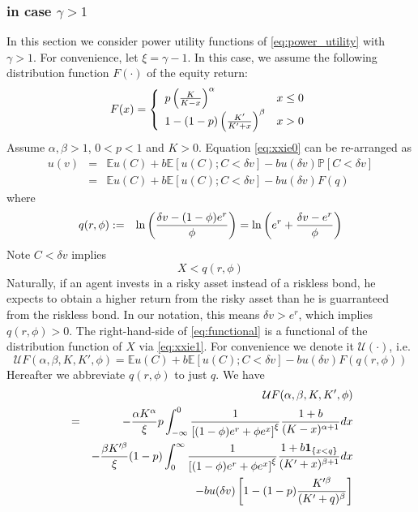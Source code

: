 \documentclass{article}
\newcommand{\E}{
  \mathbb{E}
}
\renewcommand{\P}{
  \mathbb{P}
}
\newcommand{\1}[1]{
  \mathbf{1}_{\{#1\}}
}
\begin{document}

\subsubsection[in case gamma > 1]{in case $\gamma > 1$}
In this section we consider power utility functions of
\eqref{eq:power_utility} with $\gamma > 1$. For convenience,
let $\xi = \gamma - 1$. In this case, we assume the following
distribution function $F(\cdot)$ of the equity return:
\begin{equation}
  \label{eq:X_distr}
  F(x) = \left\{
  \begin{array}{ll}
    p \left(
    {K \over K - x}
    \right)^\alpha & x \leq 0 \\
    1 - (1 - p) \left(
    {K' \over K' + x}
    \right)^\beta & x > 0
  \end{array}
  \right.
\end{equation}
Assume $\alpha, \beta > 1$, $0 < p < 1$ and $K > 0$.
Equation
\eqref{eq:xxie0} can be re-arranged as
\begin{eqnarray}
u(v) &=& \E u(C) + b \E [u(C); C < \delta v] - b u(\delta v) \P[C < \delta v] \nonumber \\
&=& \E u(C) + b \E [u(C); C < \delta v] - b u(\delta v) F(q) \label{eq:functional}
\end{eqnarray}
where
\begin{eqnarray*}
  q(r, \phi) &:=& \ln \left( {
    \delta v - (1 - \phi) e^r
    \over
    \phi
} \right) = \ln\left(
e^r + {\delta v - e^r \over \phi}
\right)
\end{eqnarray*}
Note $C < \delta v$ implies
\[
X < q(r, \phi)
\]
Naturally, if an agent invests in a risky asset instead of a riskless
bond, he expects to obtain a higher return from the risky asset than
he is guarranteed from the riskless bond. In our notation,
this means $\delta v > e^r$, which implies $q(r, \phi) > 0$.
The right-hand-side of \eqref{eq:functional} is a functional of the
distribution function of $X$ via \eqref{eq:xxie1}. For convenience
we denote it $\mathcal U(\cdot)$, i.e.
\[
\mathcal U F (\alpha, \beta, K, K', \phi)
= 
\E u(C) + b \E [u(C); C < \delta v] - b u(\delta v) F(q(r, \phi))
\]
Hereafter we abbreviate $q(r, \phi)$ to just $q$. We have
\begin{eqnarray}
  && \mathcal U F (\alpha, \beta, K, K', \phi) \nonumber \\
  &=&
  -{\alpha K^\alpha \over \xi} p
  \int_{-\infty}^0
      {
       1 \over \left[ (1 - \phi) e^r + \phi e^x \right]^{\xi}
      }
  {1 + b \over (K - x)^{\alpha + 1}} dx
  \nonumber \\
  && -{\beta K'^\beta \over \xi} (1 - p)
  \int_{0}^\infty
  {
   1 \over \left[ (1 - \phi) e^r + \phi e^x \right]^{\xi}
  }
  {1 + b \1{x < q} \over (K' + x)^{\beta + 1}} dx \nonumber \\
  &&
  - b u(\delta v) \left[
    1 - (1 - p) {
      K'^\beta
      \over
      (K' + q)^\beta
    }
  \right]
  \label{eq:xxie1.0}
\end{eqnarray}
\end{document}
